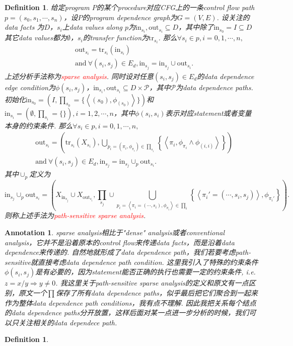 \documentclass{article}
\newtheorem{definition}[theorem]{Definition}
\newtheorem{annotation}[theorem]{Annotation}
\newcommand{\redt}[1]{\textcolor{red}{#1}}
\newcommand{\abracket}[1]{\ensuremath{\left< #1 \right>}}
\begin{document}
\newpage
\begin{definition}
\rm 给定program $P$的某个procedure对应CFG上的一条control flow path  $p = (s_0, s_1,\cdots, s_n)$，设$P$的program dependence graph为$G = (V,E)$. 设关注的data facts 为$D$，$s_i$上data values along $p$为$\text{in}_{s_i},\text{out}_{s_i} \subseteq D$，其中除了$\text{in}_{s_0} = I \subseteq D$其它data values都为$\emptyset$，$s_i$的transfer function为$\text{tr}_{s_i}$. 那么$\forall s_i \in p, i=0,1,\cdots,n,$
$$
\begin{aligned}
&\text{out}_{s_i} = \text{tr}_{s_i}(\text{in}_{s_i}) \\
&\text{and}~\forall (s_i,s_j) \in E_d,  \text{in}_{s_j} = \text{in}_{s_j} \cup \text{out}_{s_i}. 
\end{aligned}
$$
上述分析手法称为\redt{sparse analysis}. 同时设对任意$(s_i,s_j)\in E_d$的data dependence edge condition为$\phi(s_i,s_j)$，$\text{in}_{s_i},\text{out}_{s_i} \subseteq D \times \mathcal{P}$，其中$\mathcal{P}$为data dependence paths. 初始化$\text{in}_{s_0} = (I,\prod_{s_0} = \{\abracket{(s_0),\phi_{(s_0)}}\})$和$\text{in}_{s_i} = (\emptyset,\prod_{s_i}=\{\}),i=1,2,\cdots,n$，其中$\phi(s_i,s_i)$表示对应statement或者变量本身的约束条件. 那么$\forall s_i \in p, i=0,1,\cdots,n,$
$$
\begin{aligned}
&\text{out}_{s_i} = \left(\text{tr}_{s_i}(X_{s_i}),\bigcup\limits_{p_{i} = (\pi_i,\phi_{\pi_i}) \in \prod_{s_i}}\left\{\abracket{\pi_i,\phi_{\pi_i} \wedge \phi_{(i,i)}}\right\}\right) \\
&\text{and}~\forall (s_i,s_j) \in E_d,  \text{in}_{s_j} = \text{in}_{s_j} \cup_p \text{out}_{s_i}.
\end{aligned}
$$
其中$\cup_p$定义为
$$
\text{in}_{s_j} \cup_p \text{out}_{s_i} = \left(X_{\text{in}_{s_j}} \cup X_{\text{out}_{s_i}},  \prod_{s_j} \cup \bigcup\limits_{p_i = \abracket{\pi_i=(\cdots,s_i),\phi_{\pi_i}} \in \prod_{i}} \left\{\abracket{\pi_i'=(\cdots,s_i,s_j)}, \phi_{\pi_{i}'}\right\}\right). 
$$
则称上述手法为\redt{path-sensitive sparse analysis}. 
\end{definition}

\begin{annotation}
\rm sparse analysis相比于"dense" analysis或者conventional analysis，它并不是沿着原本的control flow来传递data facts，而是沿着data dependence来传递的. 自然地就形成了data dependence path，我们若要考虑path-sensitive就直接考虑data dependence path condition. 这里我引入了特殊的约束条件$\phi(s_i,s_j)$是有必要的，因为statement能否正确的执行也需要一定的约束条件, i.e. $z = x/y \Rightarrow y \neq 0$. 我这里关于path-sensitive sparse analysis的定义和原文有一点区别，原文一个$\prod$保存了所有data dependence paths，似乎最后把它们聚合到一起来作为整体data dependence path conditions，我有点不理解. 因此我把关系每个结点的data dependence paths分开放置，这样后面对某一点进一步分析的时候，我们可以只关注相关的data dependece path.  
\end{annotation}

\begin{definition}
\rm  
\end{definition}
\end{document}
